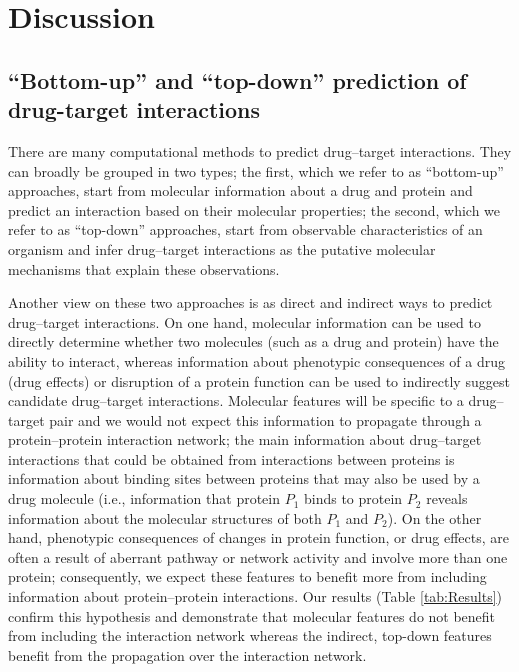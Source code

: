\documentclass{bioinfo}
\begin{document}
\section{Discussion}

\subsection{``Bottom-up'' and ``top-down'' prediction of drug-target interactions}

There are many computational methods to predict drug--target
interactions. They can broadly be grouped in two types; the first,
which we refer to as ``bottom-up'' approaches, start from molecular
information about a drug and protein and predict an interaction based
on their molecular properties; the second, which we refer to as
``top-down'' approaches, start from observable characteristics of an
organism and infer drug--target interactions as the putative molecular
mechanisms that explain these observations.

Another view on these two approaches is as direct and indirect ways to
predict drug--target interactions. On one hand, molecular information can be used
to directly determine whether two molecules (such as a drug and
protein) have the ability to interact, whereas information about
phenotypic consequences of a drug (drug effects) or disruption of a
protein function can be used to indirectly suggest candidate
drug--target interactions. Molecular features will be specific to a
drug--target pair and we would not expect this information to
propagate through a protein--protein interaction network; the main
information about drug--target interactions that could be obtained
from interactions between proteins is information about binding sites
between proteins that may also be used by a drug molecule (i.e.,
information that protein $P_1$ binds to protein $P_2$ reveals
information about the molecular structures of both $P_1$ and
$P_2$). On the other hand, phenotypic consequences of changes in
protein function, or drug effects, are often a result of aberrant
pathway or network activity and involve more than one protein;
consequently, we expect these features to benefit more from including
information about protein--protein interactions. Our results (Table
\ref{tab:Results}) confirm this hypothesis and demonstrate that
molecular features do not benefit from including the interaction
network whereas the indirect, top-down features benefit from the
propagation over the interaction network.
\end{document}
